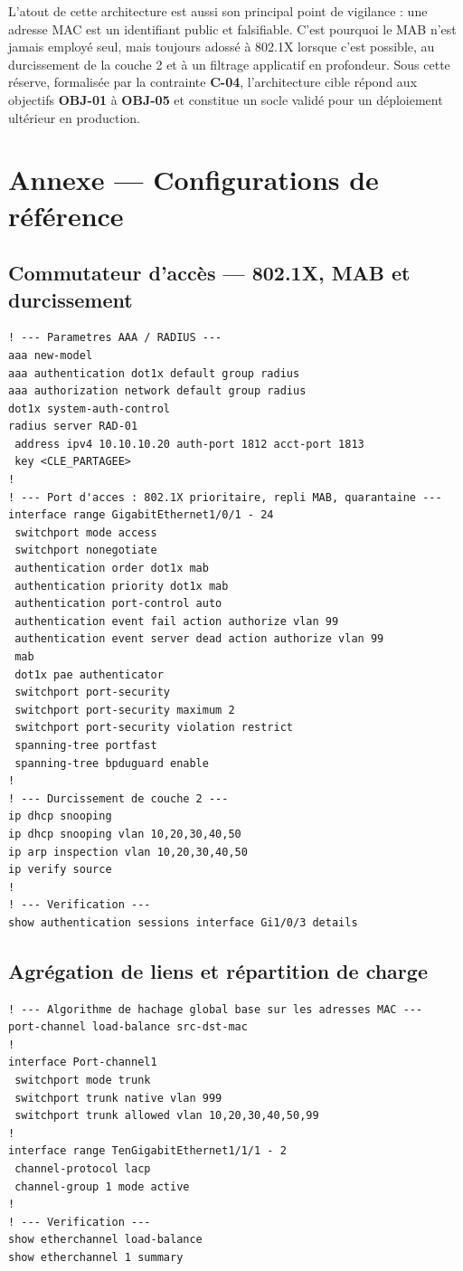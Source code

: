 \documentclass[11pt,a4paper]{article}
\newcommand{\rid}[1]{\textcolor{primary}{\textbf{\small #1}}}
\begin{document}
L'atout de cette architecture est aussi son principal point de vigilance : une adresse MAC est un identifiant public et falsifiable. C'est pourquoi le MAB n'est jamais employé seul, mais toujours adossé à 802.1X lorsque c'est possible, au durcissement de la couche 2 et à un filtrage applicatif en profondeur. Sous cette réserve, formalisée par la contrainte \rid{C-04}, l'architecture cible répond aux objectifs \rid{OBJ-01} à \rid{OBJ-05} et constitue un socle validé pour un déploiement ultérieur en production.

\appendix
\section{Annexe --- Configurations de référence}

\subsection{Commutateur d'accès --- 802.1X, MAB et durcissement}
\begin{lstlisting}
! --- Parametres AAA / RADIUS ---
aaa new-model
aaa authentication dot1x default group radius
aaa authorization network default group radius
dot1x system-auth-control
radius server RAD-01
 address ipv4 10.10.10.20 auth-port 1812 acct-port 1813
 key <CLE_PARTAGEE>
!
! --- Port d'acces : 802.1X prioritaire, repli MAB, quarantaine ---
interface range GigabitEthernet1/0/1 - 24
 switchport mode access
 switchport nonegotiate
 authentication order dot1x mab
 authentication priority dot1x mab
 authentication port-control auto
 authentication event fail action authorize vlan 99
 authentication event server dead action authorize vlan 99
 mab
 dot1x pae authenticator
 switchport port-security
 switchport port-security maximum 2
 switchport port-security violation restrict
 spanning-tree portfast
 spanning-tree bpduguard enable
!
! --- Durcissement de couche 2 ---
ip dhcp snooping
ip dhcp snooping vlan 10,20,30,40,50
ip arp inspection vlan 10,20,30,40,50
ip verify source
!
! --- Verification ---
show authentication sessions interface Gi1/0/3 details
\end{lstlisting}

\subsection{Agrégation de liens et répartition de charge}
\begin{lstlisting}
! --- Algorithme de hachage global base sur les adresses MAC ---
port-channel load-balance src-dst-mac
!
interface Port-channel1
 switchport mode trunk
 switchport trunk native vlan 999
 switchport trunk allowed vlan 10,20,30,40,50,99
!
interface range TenGigabitEthernet1/1/1 - 2
 channel-protocol lacp
 channel-group 1 mode active
!
! --- Verification ---
show etherchannel load-balance
show etherchannel 1 summary
\end{lstlisting}
\end{document}
